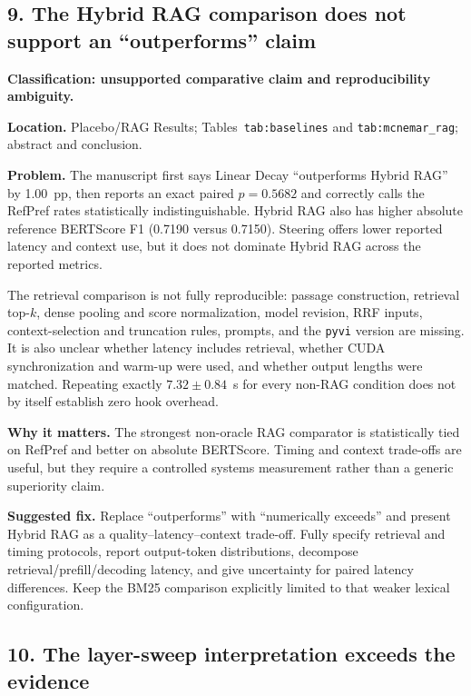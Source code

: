 \documentclass[11pt]{article}
\begin{document}
\subsection*{9. The Hybrid RAG comparison does not support an ``outperforms'' claim}

\textbf{Classification: unsupported comparative claim and reproducibility ambiguity.}

\textbf{Location.} Placebo/RAG Results; Tables~\texttt{tab:baselines} and \texttt{tab:mcnemar\_rag}; abstract and conclusion.

\textbf{Problem.} The manuscript first says Linear Decay ``outperforms Hybrid RAG'' by 1.00~pp, then reports an exact paired $p=0.5682$ and correctly calls the RefPref rates statistically indistinguishable.  Hybrid RAG also has higher absolute reference BERTScore F1 (0.7190 versus 0.7150).  Steering offers lower reported latency and context use, but it does not dominate Hybrid RAG across the reported metrics.

The retrieval comparison is not fully reproducible: passage construction, retrieval top-$k$, dense pooling and score normalization, model revision, RRF inputs, context-selection and truncation rules, prompts, and the \texttt{pyvi} version are missing.  It is also unclear whether latency includes retrieval, whether CUDA synchronization and warm-up were used, and whether output lengths were matched.  Repeating exactly $7.32\pm0.84$~s for every non-RAG condition does not by itself establish zero hook overhead.

\textbf{Why it matters.} The strongest non-oracle RAG comparator is statistically tied on RefPref and better on absolute BERTScore.  Timing and context trade-offs are useful, but they require a controlled systems measurement rather than a generic superiority claim.

\textbf{Suggested fix.} Replace ``outperforms'' with ``numerically exceeds'' and present Hybrid RAG as a quality--latency--context trade-off.  Fully specify retrieval and timing protocols, report output-token distributions, decompose retrieval/prefill/decoding latency, and give uncertainty for paired latency differences.  Keep the BM25 comparison explicitly limited to that weaker lexical configuration.

\subsection*{10. The layer-sweep interpretation exceeds the evidence}
\end{document}
